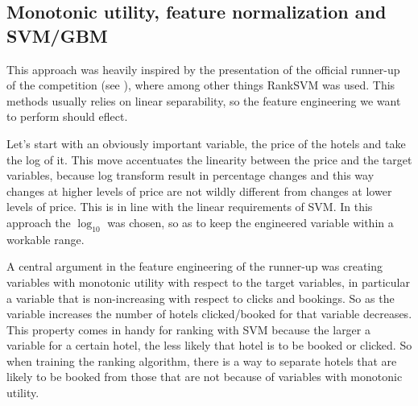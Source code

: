 \documentclass{llncs}
\begin{document}
\subsection{Monotonic utility, feature normalization and SVM/GBM}
This approach was heavily inspired by the presentation of the official runner-up of the competition (see \cite{Wang2013}), where among other things RankSVM was used. This methods usually relies on linear separability, so the feature engineering we want to perform should eflect.

Let's start with an obviously important variable, the price of the hotels and take the log of it. This move accentuates the linearity between the price and the target variables, because log transform result in percentage changes and this way changes at higher levels of price are not wildly different from changes at lower levels of price. This is in line with the linear requirements of SVM. In this approach the $\log_{10}$ was chosen, so as to keep the engineered variable within a workable range.

A central argument in the feature engineering of the runner-up was creating variables with monotonic utility with respect to the target variables, in particular a variable that is non-increasing with respect to clicks and bookings. So as the variable increases the number of hotels clicked/booked for that variable decreases. This property comes in handy for ranking with SVM because the larger a variable for a certain hotel, the less likely that hotel is to be booked or clicked. So when training the ranking algorithm, there is a way to separate hotels that are likely to be booked from those that are not because of variables with monotonic utility.
\end{document}
